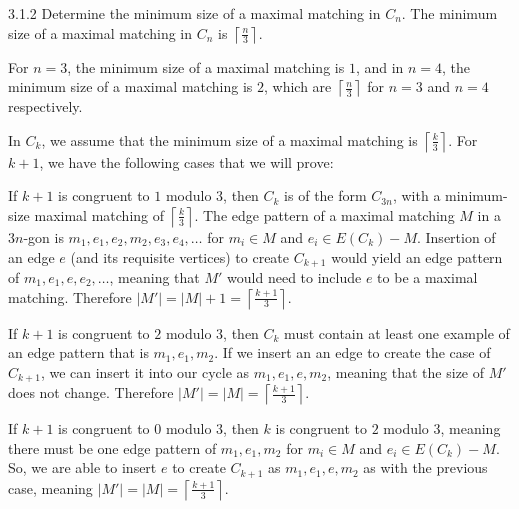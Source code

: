 \documentclass[10pt]{extarticle}
\begin{document}
  \begin{problem}{3.1.2}
    Determine the minimum size of a maximal matching in $C_n$.
    \tcblower
    The minimum size of a maximal matching in $C_n$ is $\left\lceil \frac{n}{3}\right\rceil$.\\
    \begin{description}[font=\normalfont\scshape]
      \item[Base Case] For $n = 3$, the minimum size of a maximal matching is $1$, and in $n =4$, the minimum size of a maximal matching is $2$, which are $\left\lceil \frac{n}{3}\right\rceil$ for $n = 3$ and $n=4$ respectively.
      \item[Inductive Step] In $C_k$, we assume that the minimum size of a maximal matching is $\left\lceil \frac{k}{3} \right\rceil$. For $k+1$, we have the following cases that we will prove:
        \begin{description}[font=\normalfont]
          \item[$k+1 \equiv 1$ mod $3$:] If $k+1$ is congruent to $1$ modulo $3$, then $C_k$ is of the form $C_{3n}$, with a minimum-size maximal matching of $\left\lceil \frac{k}{3}\right\rceil$. The edge pattern of a maximal matching $M$ in a $3n$-gon is $m_1, e_1, e_2, m_2,e_3,e_4,\dots$ for $m_i\in M$ and $e_i \in E(C_k) - M$. Insertion of an edge $e$ (and its requisite vertices) to create $C_{k+1}$ would yield an edge pattern of $m_1,e_1,e,e_2,\dots$, meaning that $M'$ would need to include $e$ to be a maximal matching. Therefore $|M'| = |M| + 1 = \left\lceil \frac{k+1}{3} \right\rceil$.
          \item[$k+1\equiv 2$ mod $3$:] If $k+1$ is congruent to $2$ modulo $3$, then $C_k$ must contain at least one example of an edge pattern that is $m_1,e_1,m_2$. If we insert an an edge to create the case of $C_{k+1}$, we can insert it into our cycle as $m_1,e_1,e,m_2$, meaning that the size of $M'$ does not change. Therefore $|M'| = |M| = \left\lceil \frac{k+1}{3}\right\rceil$.
          \item[$k+1\equiv 0$ mod 3:] If $k+1$ is congruent to $0$ modulo $3$, then $k$ is congruent to $2$ modulo $3$, meaning there must be one edge pattern of $m_1,e_1,m_2$ for $m_i\in M$ and $e_i\in E(C_k) - M$. So, we are able to insert $e$ to create $C_{k+1}$ as $m_1,e_1,e,m_2$ as with the previous case, meaning $|M'| = |M| = \left\lceil \frac{k+1}{3}\right\rceil$.
        \end{description}
    \end{description}
  \end{problem}
\end{document}

